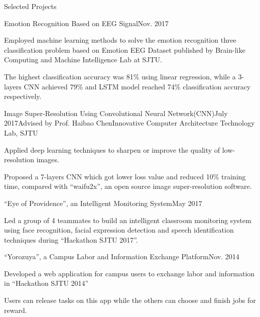 \documentclass{resume_ucla} %
\begin{document}
\begin{rSection}{Selected Projects}
\begin{rSubsection}{Emotion Recognition Based on EEG Signal}{Nov. 2017}{}{}
\item Employed machine learning methods to solve the emotion recognition three classification problem based on Emotion EEG Dataset published by Brain-like Computing and Machine Intelligence Lab at SJTU.
\item The highest classification accuracy was 81\% using linear regression, while a 3-layers CNN achieved 79\% and LSTM model reached 74\% classification accuracy respectively.
\end{rSubsection}

\begin{rSubsection}{Image Super-Resolution Using Convolutional Neural Network(CNN)}{July 2017}{Advised by Prof. Haibao Chen}{Innovative Computer Architecture Technology Lab, SJTU}
\item Applied deep learning techniques to sharpen or improve the quality of low-resolution images.
\item Proposed a 7-layers CNN which got lower loss value and reduced 10\% training time, compared with ``waifu2x'', an open source image super-resolution software.
\end{rSubsection}

\begin{rSubsection}{``Eye of Providence'', an Intelligent Monitoring System}{May 2017}{}{}
\item Led a group of 4 teammates to build an intelligent classroom monitoring system using face recognition, facial expression detection and speech identification techniques during ``Hackathon SJTU 2017''.
\end{rSubsection}

\begin{comment}
\begin{rSubsection}{Design and Realization of 5-stage-pipeline MIPS processor}{Nov. 2014}{Advised by Prof. Yongxin Zhu}{Lab of Embedded Architecture, SJTU}
\item Acted as a team leader and took charge of the module design and Verilog HDL code implementation. 
\item Resolved data hazards using forwarding and implemented dynamic branch prediction to deal with control hazards.
\end{rSubsection}
\end{comment}

\begin{rSubsection}{``Yorozuya'', a Campus Labor and Information Exchange Platform}{Nov. 2014}{}{}
\item Developed a web application for campus users to exchange labor and information in ``Hackathon SJTU 2014'' 
\item Users can release tasks on this app while the others can choose and finish jobs for reward.
\end{rSubsection}


\end{rSection}
\end{document}

